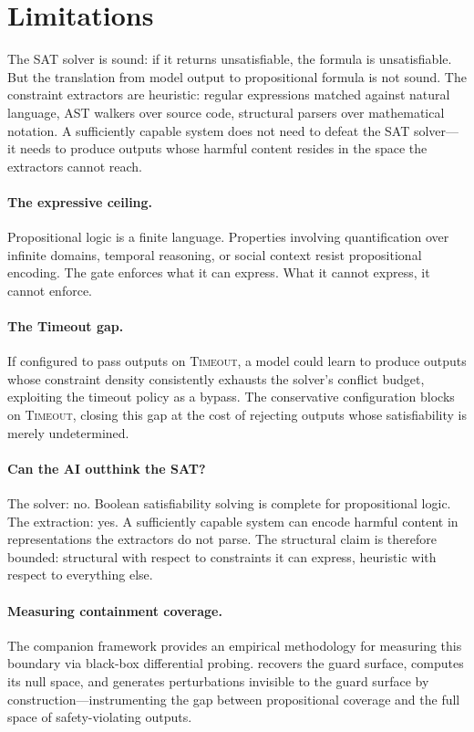 \documentclass[11pt,a4paper]{article}
\begin{document}
\section{Limitations}
The SAT solver is sound: if it returns unsatisfiable, the formula is unsatisfiable.
But the translation from model output to propositional formula is not sound.
The constraint extractors are heuristic: regular expressions matched against natural language, AST walkers over source code, structural parsers over mathematical notation.
A sufficiently capable system does not need to defeat the SAT solver---it needs to produce outputs whose harmful content resides in the space the extractors cannot reach.

\paragraph{The expressive ceiling.}
Propositional logic is a finite language.
Properties involving quantification over infinite domains, temporal reasoning, or social context resist propositional encoding.
The gate enforces what it can express.
What it cannot express, it cannot enforce.

\paragraph{The Timeout gap.}
If configured to pass outputs on \textsc{Timeout}, a model could learn to produce outputs whose constraint density consistently exhausts the solver's conflict budget, exploiting the timeout policy as a bypass.
The conservative configuration blocks on \textsc{Timeout}, closing this gap at the cost of rejecting outputs whose satisfiability is merely undetermined.

\paragraph{Can the AI outthink the SAT?}
The solver: no.
Boolean satisfiability solving is complete for propositional logic.
The extraction: yes.
A sufficiently capable system can encode harmful content in representations the extractors do not parse.
The structural claim is therefore bounded: structural with respect to constraints it can express, heuristic with respect to everything else.

\paragraph{Measuring containment coverage.}
The companion  framework provides an empirical methodology for measuring this boundary via black-box differential probing.
 recovers the guard surface, computes its null space, and generates perturbations invisible to the guard surface by construction---instrumenting the gap between propositional coverage and the full space of safety-violating outputs.
\end{document}
